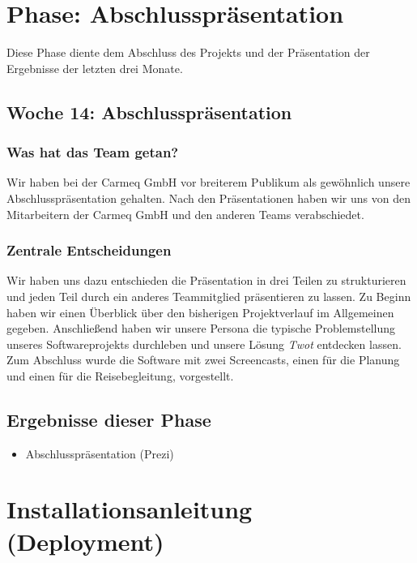 \documentclass{article}
\begin{document}
\section{Phase: Abschlusspr\"asentation}

Diese Phase diente dem Abschluss des Projekts und der Pr\"asentation der Ergebnisse der letzten drei Monate.

\subsection{Woche 14: Abschlusspr\"asentation}

\subsubsection{Was hat das Team getan?}

Wir haben bei der Carmeq GmbH vor breiterem Publikum als gew\"ohnlich unsere Abschlusspr\"asentation gehalten. Nach den Pr\"asentationen haben wir uns von den Mitarbeitern der Carmeq GmbH und den anderen Teams verabschiedet.

\subsubsection{Zentrale Entscheidungen}

Wir haben uns dazu entschieden die Pr\"asentation in drei Teilen zu strukturieren und jeden Teil durch ein anderes Teammitglied pr\"asentieren zu lassen. Zu Beginn haben wir einen \"Uberblick \"uber den bisherigen Projektverlauf im Allgemeinen gegeben. Anschlie\ss end haben wir unsere Persona die typische Problemstellung unseres Softwareprojekts durchleben und unsere L\"osung \textit{Twot} entdecken lassen. Zum Abschluss wurde die Software mit zwei Screencasts, einen f\"ur die Planung und einen f\"ur die Reisebegleitung, vorgestellt.

\subsection{Ergebnisse dieser Phase}

\begin{itemize}
\item Abschlusspr\"asentation (Prezi)
\end{itemize}

\section{Installationsanleitung (Deployment)}
\end{document}
